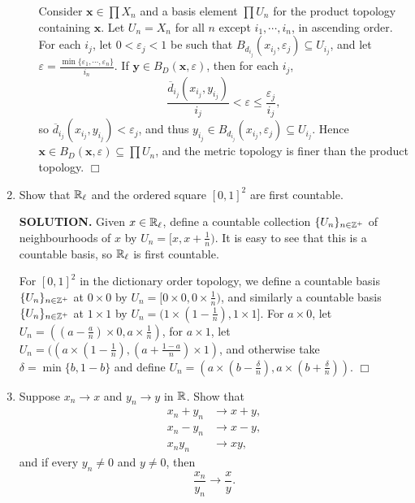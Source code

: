 \documentclass{article}
\begin{document}
\begin{enumerate}
\begin{enumerate}
        Consider $\mathbf{x} \in \prod X_n$ and a basis element $\prod U_n$ for the product topology containing $\mathbf{x}$. Let $U_n = X_n$ for all $n$ except $i_1, \cdots, i_n$, in ascending order. For each $i_j$, let $0 < \varepsilon_j < 1$ be such that $B_{d_{i_j}}(x_{i_j}, \varepsilon_j) \subseteq U_{i_j}$, and let $\varepsilon = \frac{\min \{\varepsilon_1, \cdots, \varepsilon_n\}}{i_n}$. If $\mathbf{y} \in B_D(\mathbf{x}, \varepsilon)$, then for each $i_j$,
        $$\frac{\overline{d}_{i_j}(x_{i_j}, y_{i_j})}{i_j} < \varepsilon \leq \frac{\varepsilon_j}{i_j},$$
        so $\overline{d}_{i_j}(x_{i_j}, y_{i_j}) < \varepsilon_j$, and thus $y_{i_j} \in B_{d_{i_j}}(x_{i_j}, \varepsilon_j) \subseteq U_{i_j}$. Hence $\mathbf{x} \in B_D(\mathbf{x}, \varepsilon) \subseteq \prod U_n$, and the metric topology is finer than the product topology. $\Box$
    \end{enumerate}

    \item Show that $\mathbb{R}_\ell$ and the ordered square $[0, 1]^2$ are first countable.

    {\bf SOLUTION.} Given $x \in \mathbb{R}_\ell$, define a countable collection $\{U_n\}_{n \in \mathbb{Z}^+}$ of neighbourhoods of $x$ by $U_n = [x, x + \frac1n)$. It is easy to see that this is a countable basis, so $\mathbb{R}_\ell$ is first countable.

    For $[0, 1]^2$ in the dictionary order topology, we define a countable basis $\{U_n\}_{n \in \mathbb{Z}^+}$ at $0 \times 0$ by $U_n = [0\times 0, 0 \times \frac1n)$, and similarly a countable basis $\{U_n\}_{n \in\mathbb{Z}^+}$ at $1 \times 1$ by $U_n = (1 \times (1- \frac1n), 1 \times 1]$. For $a \times 0$, let $U_n = ((a - \frac{a}{n}) \times 0, a \times \frac1n)$, for $a \times 1$, let $U_n = ((a \times (1-\frac1n), (a + \frac{1-a}{n}) \times 1)$, and otherwise take $\delta = \min \{b, 1-b\}$ and define $U_n = (a \times (b- \frac{\delta}{n}), a \times (b+ \frac{\delta}{n}))$. $\Box$

    \item Suppose $x_n \rightarrow x$ and $y_n \rightarrow y$ in $\mathbb{R}$. Show that
    \begin{align*}
        x_n + y_n &\rightarrow x + y, \\
        x_n - y_n &\rightarrow x-y, \\
        x_ny_n &\rightarrow xy,        
    \end{align*}
    and if every $y_n \neq 0$ and $y \neq 0$, then
    $$\frac{x_n}{y_n} \rightarrow \frac{x}{y}.$$


\end{enumerate}
\end{document}
